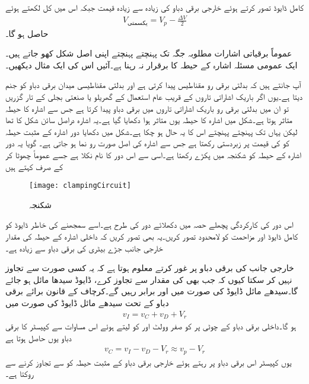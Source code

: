 کامل ڈایوڈ تصور کرتے ہوئے خارجی برقی دباو کی زیادہ سے زیادہ قیمت  جبکہ اس میں کل   لکھتے ہوئے
\begin{align}
V_{\textrm{یکسمتی}}=V_p-\frac{\Delta V}{2}
\end{align}
حاصل ہو گا۔

عموماً برقیاتی اشارات مطلوبہ جگہ تک پہنچتے پہنچتے اپنی اصل شکل کھو جاتے ہیں۔ ایک عمومی مسئلہ اشارہ کے حیطہ کا برقرار نہ رہنا ہے۔آئیں اس کی ایک مثال دیکھیں۔

آپ جانتے ہیں کہ بدلتی برقی رو مقناطیس پیدا کرتی ہے اور بدلتی مقناطیسی میدان برقی دباو کو جنم دیتا ہے۔یوں اگر باریک اشاراتی تاروں کے قریب عام استعمال کے گھریلو یا صنعتی بجلی کے تار گزریں تو ان میں بدلتی برقی رو باریک اشاراتی تاروں میں برقی دباو پیدا کرتا ہے جس سے اشارہ کا حیطہ متاثر ہوتا ہے۔شکل   میں اشارہ   کا حیطہ یوں متاثر ہوا دکھایا گیا ہے۔یہ اشارہ دراصل سائن شکل کا تھا لیکن یہاں تک پہنچتے پہنچتے اس کا یہ حال ہو چکا ہے۔شکل   میں دکھایا دور اشارہ کے مثبت حیطہ کو  کی قیمت پر زبردستی رکھتا ہے جس سے اشارہ کی اصل صورت رو نما ہو جاتی ہے۔ گویا یہ دور اشارہ کے حیطہ کو شکنجہ میں پکڑے رکھتا ہے۔اسی سے اس دور کا نام   نکلا ہے جسے عموماً چھوٹا  کر کے صرف  کہتے ہیں
\begin{figure}
\centering
\texttt{[image: clampingCircuit]}
\caption{شکنجہ}
\label{شکل_شکنجہ}
\end{figure}
اس دور کی کارکردگی پچھلے حصہ میں دکھلائے دور کی طرح ہے۔اسے سمجھنے کی خاطر ڈایوڈ   کو کامل ڈایوڈ اور مزاحمت  کو لامحدود تصور کریں۔یہ بھی تصور کریں کہ داخلی اشارہ  کے حیطہ  کی مقدار خارجی جانب جڑے بیٹری کی برقی دباو  سے زیادہ ہے۔


خارجی جانب کی برقی دباو  پر غور کرتے معلوم ہوتا ہے کہ یہ کسی صورت  سے تجاوز نہیں کر سکتا کیوں کہ جب بھی  کی مقدار  سے تجاوز کرے،  ڈایوڈ سیدھا مائل ہو جائے گا۔سیدھے مائل ڈایوڈ کی صورت میں  اور  برابر رہیں گے۔کرچاف کے قانون برائے برقی دباو کے تحت سیدھے مائل ڈایوڈ کی صورت میں
\begin{align*}
v_I=v_C+v_D+V_r
\end{align*}
ہو گا۔داخلی برقی دباو کے چوٹی پر  کو صفر وولٹ اور  کو  لیتے ہوئے اس مساوات سے کپیسٹر کا برقی دباو یوں حاصل ہوتا ہے
\begin{align*}
v_C= v_I-v_D-V_r \approx v_p - V_r
\end{align*}
یوں کپیسٹر اس برقی دباو پر رہتے ہوئے خارجی برقی دباو کے مثبت حیطہ کو  سے تجاوز کرنے سے روکتا ہے۔

